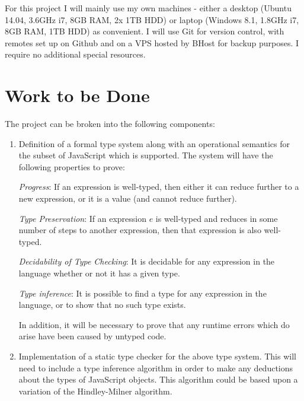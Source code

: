 \documentclass{article}
\begin{document}
		For this project I will mainly use my own machines - either a desktop
		(Ubuntu 14.04, 3.6GHz i7, 8GB RAM, 2x 1TB HDD) or laptop (Windows 8.1,
		1.8GHz i7, 8GB RAM, 1TB HDD) as convenient. I will use Git for version
		control, with remotes set up on Github and on a VPS hosted by BHost for
		backup purposes. I require no additional special resources.
				
	\section{Work to be Done}\label{prop-work-to-be-done}

		The project can be broken into the following components:

		\begin{enumerate}\def\labelenumi{\arabic{enumi}.}
		 \item Definition of a formal type system along with an operational
		   semantics for the subset of JavaScript which is supported. The
		   system will have the following properties to prove:   
			
			\emph{Progress}: If an expression is well-typed, then either it can
			reduce further to a new expression, or it is a value (and cannot
			reduce further). 

			\emph{Type Preservation}: If an expression $e$ is well-typed and
			reduces in some number of steps to another expression, then that
			expression is also well-typed.
			
			\emph{Decidability of Type Checking}: It is decidable for any
			expression in the language whether or not it has a given type.
			
			\emph{Type inference}: It is possible to find a type for any
			expression in the language, or to show that no such type exists.

		 In addition, it will be necessary to prove that any runtime errors
		 which do arise have been caused by untyped code.
		 
		 \item Implementation of a static type checker for the above type
		   system. This will need to include a type inference algorithm in
		   order to make any deductions about the types of JavaScript objects.
		   This algorithm could be based upon a variation of the Hindley-Milner
		   algorithm.
		 

\end{enumerate}
\end{document}
